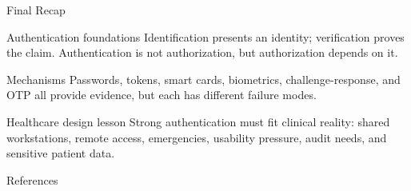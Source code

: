 \documentclass[presentation]{beamer}
\begin{document}
\begin{frame}[c]{Final Recap}
  \begin{block}{Authentication foundations}
    Identification presents an identity; verification proves the claim. Authentication is not authorization, but authorization depends on it.
  \end{block}

  \begin{block}{Mechanisms}
    Passwords, tokens, smart cards, biometrics, challenge-response, and OTP all provide evidence, but each has different failure modes.
  \end{block}

  \begin{block}{Healthcare design lesson}
    Strong authentication must fit clinical reality: shared workstations, remote access, emergencies, usability pressure, audit needs, and sensitive patient data.
  \end{block}
\end{frame}

\begin{frame}[allowframebreaks]{References}
  \scriptsize
  
  
\end{frame}
\end{document}
